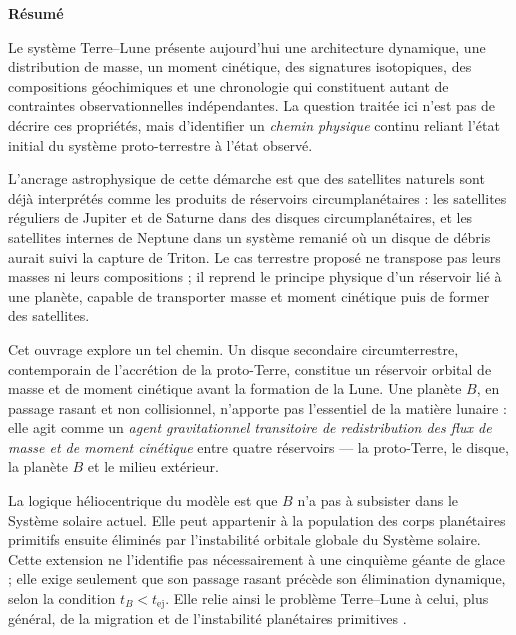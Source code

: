 \documentclass[11pt,a4paper,openany]{report}
\begin{document}
\thispagestyle{plain}
\begin{center}{\Large\bfseries Résumé}\end{center}
\medskip

Le système Terre--Lune présente aujourd'hui une architecture dynamique, une distribution de
masse, un moment cinétique, des signatures isotopiques, des compositions géochimiques et une
chronologie qui constituent autant de contraintes observationnelles indépendantes. La question
traitée ici n'est pas de décrire ces propriétés, mais d'identifier un \emph{chemin physique}
continu reliant l'état initial du système proto-terrestre à l'état observé.

L'ancrage astrophysique de cette démarche est que des satellites naturels sont déjà interprétés
comme les produits de réservoirs circumplanétaires : les satellites réguliers de Jupiter et de
Saturne dans des disques circumplanétaires, et les satellites internes de Neptune dans un système
remanié où un disque de débris aurait suivi la capture de Triton. Le cas terrestre proposé ne
transpose pas leurs masses ni leurs compositions ; il reprend le principe physique d'un réservoir
lié à une planète, capable de transporter masse et moment cinétique puis de former des satellites.

Cet ouvrage explore un tel chemin. Un disque secondaire circumterrestre, contemporain de
l'accrétion de la proto-Terre, constitue un réservoir orbital de masse et de moment cinétique
avant la formation de la Lune. Une planète $B$, en passage rasant et non collisionnel, n'apporte pas
l'essentiel de la matière lunaire : elle agit comme un \emph{agent
gravitationnel transitoire de redistribution des flux de masse et de moment cinétique} entre
quatre réservoirs --- la proto-Terre, le disque, la planète $B$ et le milieu extérieur.

La logique héliocentrique du modèle est que $B$ n'a pas à subsister dans le Système solaire
actuel. Elle peut appartenir à la population des corps planétaires primitifs ensuite éliminés par
l'instabilité orbitale globale du Système solaire. Cette extension ne l'identifie pas nécessairement
à une cinquième géante de glace ; elle exige seulement que son passage rasant précède son
élimination dynamique, selon la condition $t_B<t_{\mathrm{ej}}$. Elle relie ainsi le problème
Terre--Lune à celui, plus général, de la migration et de l'instabilité planétaires primitives
\cite{Tsiganis2005,Gomes2005,Nesvorny2011,NesvornyMorbidelli2012,Liu2022,Clement2018}.
\end{document}

